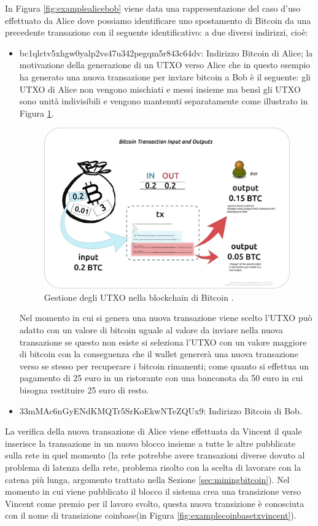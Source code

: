 In Figura \ref{fig:examplealicebob} viene data una rappresentazione del caso d’uso effettuato da Alice dove possiamo identificare uno spostamento di Bitcoin da una precedente transazione con il seguente identificativo:  a due diversi indirizzi, cioè:
\begin{itemize}
  \item bc1qlctv5xhgw0yalp2vs47u342pegqm5r843c64dv: Indirizzo Bitcoin di Alice; la motivazione della generazione di un UTXO verso Alice che in questo esempio ha generato una nuova transazione per inviare bitcoin a Bob è il seguente:  gli UTXO di Alice non vengono mischiati e messi insieme ma bensì gli UTXO sono unità indivisibili e vengono mantenuti separatamente come illustrato in Figura \ref{fig:examplechangeutxo}.
  \begin{figure}[h]
  \begin{center}
  \includegraphics[width=0.6\columnwidth]{images/change_utxo.png}
  \end{center}
  \caption{Gestione degli UTXO nella blockchain di Bitcoin \cite{blockstream:esplora}.}
  \label{fig:examplechangeutxo}
  \end{figure}
  Nel momento in cui si genera una nuova transazione viene scelto l’UTXO può adatto con un valore di bitcoin uguale al valore da inviare nella nuova transazione se questo non esiste si seleziona l’UTXO con un valore maggiore di bitcoin con la conseguenza che il wallet genererà una nuova transazione verso se stesso per recuperare i bitcoin rimanenti; come quanto si effettua un pagamento di 25 euro in un ristorante con una banconota da 50 euro in cui bisogna restituire 25 euro di resto.
  \item 33mMAc6nGyENdKMQTr5SrKoEkwNTeZQUx9: Indirizzo Bitcoin di Bob.
\end{itemize}

La verifica della nuova transazione di Alice viene effettuata da Vincent il quale inserisce la transazione in un nuovo blocco insieme a tutte le altre pubblicate sulla rete in quel momento (la rete potrebbe avere transazioni diverse dovuto al problema di latenza della rete, problema risolto con la scelta di lavorare con la catena più lunga, argomento trattato nella Sezione \ref{sec:miningbitcoin}).
Nel momento in cui viene pubblicato il blocco il sistema crea una transizione verso Vincent come premio per il lavoro svolto, questa nuova transizione è conosciuta con il nome di transizione coinbase(in Figura \ref{fig:examplecoinbasetxvincent}).

